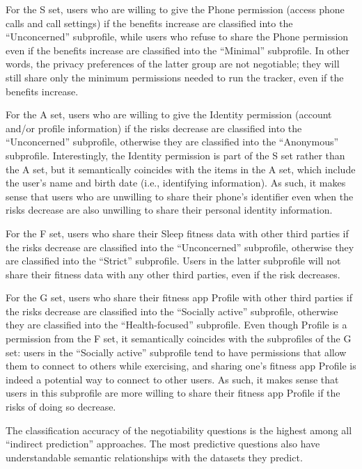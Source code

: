 For the S set, users who are willing to give the Phone permission (access phone calls and call settings) if the benefits increase are classified into the ``Unconcerned'' subprofile, while users who refuse to share the Phone permission even if the benefits increase are classified into the ``Minimal'' subprofile. In other words, the privacy preferences of the latter group are not negotiable; they will still share only the minimum permissions needed to run the tracker, even if the benefits increase.

For the A set, users who are willing to give the Identity permission (account and/or profile information) if the risks decrease are classified into the ``Unconcerned'' subprofile, otherwise they are classified into the ``Anonymous'' subprofile. Interestingly, the Identity permission is part of the S set rather than the A set, but it semantically coincides with the items in the A set, which include the user's name and birth date (i.e., identifying information). As such, it makes sense that users who are unwilling to share their phone's identifier even when the risks decrease are also unwilling to share their personal identity information.

For the F set, users who share their Sleep fitness data with other third parties if the risks decrease are classified into the ``Unconcerned'' subprofile, otherwise they are classified into the ``Strict'' subprofile. Users in the latter subprofile will not share their fitness data with any other third parties, even if the risk decreases.

For the G set, users who share their fitness app Profile with other third parties if the risks decrease are classified into the ``Socially active'' subprofile, otherwise they are classified into the ``Health-focused'' subprofile. Even though Profile is a permission from the F set, it semantically coincides with the subprofiles of the G set: users in the ``Socially active'' subprofile tend to have permissions that allow them to connect to others while exercising, and sharing one's fitness app Profile is indeed a potential way to connect to other users. As such, it makes sense that users in this subprofile are more willing to share their fitness app Profile if the risks of doing so decrease.

The classification accuracy of the negotiability questions is the highest among all ``indirect prediction'' approaches. The most predictive questions also have understandable semantic relationships with the datasets they predict.

